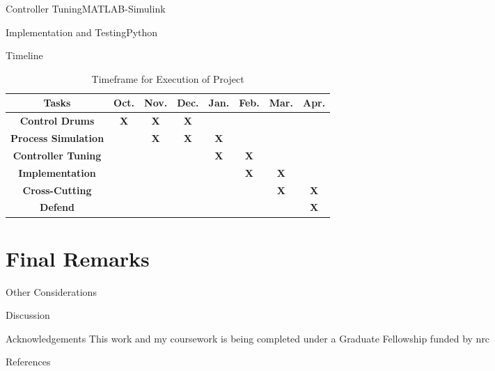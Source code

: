 \documentclass[aspectratio=1610,pdftex,dvipsnames]{beamer}
\newcommand{\x}{\cellcolor{lightgray}\textbf{X}} %
\newcommand{\acf}{\acrfull} %
\begin{document}
\begin{frame}{Controller Tuning}{MATLAB-Simulink}
    
\end{frame}

\begin{frame}{Implementation and Testing}{Python}
    
\end{frame}

\begin{frame}{Timeline}

    \begin{table}
        \centering
        \caption{Timeframe for Execution of Project}
        \begin{tabular}{c|c|c|c|c|c|c|c}
            \textbf{Tasks} & Oct. & Nov. & Dec. & Jan. & Feb. & Mar. & Apr.\\\hline
            \textbf{Control Drums} & \x & \x & \x &  &  &  & \\\hline
            \textbf{Process Simulation} &  & \x & \x & \x &  &  & \\\hline
            \textbf{Controller Tuning} &  &  &  & \x & \x &  & \\\hline
            \textbf{Implementation} &  &  &  &  & \x & \x & \\\hline
            \textbf{Cross-Cutting} &  &  &  &  &  & \x & \x\\\hline
            \textbf{Defend} &  &  &  &  &  &  & \x \\

        \end{tabular}
    \end{table}
        

\end{frame}

\section{Final Remarks}
\begin{frame}{Other Considerations}
    
\end{frame}

\begin{frame}{Discussion}

\end{frame}

\begin{frame}{Acknowledgements}
    \centering
    This work and my coursework is being completed under a Graduate Fellowship funded by \acf{nrc}
\end{frame}


\begin{frame}{References}
    
    \footnotesize
    
\end{frame}
\end{document}
